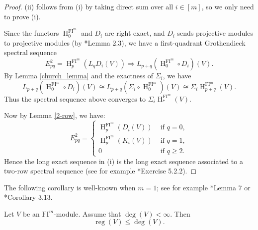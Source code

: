 \documentclass{amsart}
\numberwithin{equation}{section}
\DeclareMathOperator{\reg}{reg}
\DeclareMathOperator{\HH}{H}
\newcommand{\FI}{{\mathrm{FI}}}
\begin{document}
\begin{proof}
   (ii) follows from (i) by taking direct sum over all $i\in [m]$, so we only need to prove (i). 

   Since the functors $\HH^{\FI^m}_0$ and $D_i$ are right exact, and $D_i$ sends projective modules to projective modules (by \cite{liyu}*{Lemma 2.3}), we have a first-quadrant Grothendieck spectral sequence 
   \[ E^2_{pq} = \HH^{\FI^m}_p(L_q D_i(V)) \Rightarrow L_{p+q}(\HH^{\FI^m}_0\circ D_i)(V). \]
   By Lemma \ref{church_lemma} and the exactness of $\Sigma_i$, we have 
   \[ L_{p+q}(\HH^{\FI^m}_0\circ D_i)(V) \cong L_{p+q}(\Sigma_i\circ \HH^{\FI^m}_0)(V) \cong \Sigma_i \HH^{\FI^m}_{p+q}(V). \]
   Thus the spectral sequence above converges to $\Sigma_i\HH^{\FI^m}_*(V)$. 

   Now by Lemma \ref{2-row}, we have: 
   \[ E^2_{pq} = \begin{cases}
      \HH^{\FI^m}_p(D_i(V)) & \mbox{ if }q=0,\\
      \HH^{\FI^m}_p(K_i(V)) & \mbox{ if }q=1,\\
      0 & \mbox{ if }q\geqslant 2. 
   \end{cases}\]
   Hence the long exact sequence in (i) is the long exact sequence associated to a two-row spectral sequence (see for example \cite{weibel}*{Exercise 5.2.2}).
\end{proof}

The following corollary is well-known when $m=1$; see for example \cite{gan}*{Lemma 7} or \cite{ramos}*{Corollary 3.13}. 


\begin{corollary} \label{cor:finite degree case}
   Let $V$ be an $\FI^m$-module. Assume that $\deg(V) < \infty$. Then 
   \[ \reg(V) \leqslant \deg(V). \] 
\end{corollary}
\end{document}
